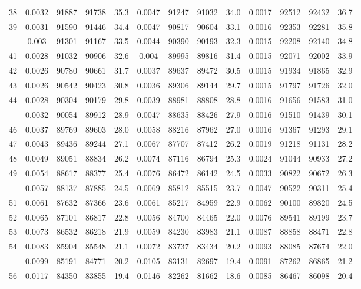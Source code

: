 \documentclass[
  14pt,
]{article}
\begin{document}
\begin{longtable}[t]{lcccccccccccc}
38 & 0.0032 & 91887 & 91738 & 35.3 & 0.0047 & 91247 & 91032 & 34.0 & 0.0017 & 92512 & 92432 & 36.7\\
39 & 0.0031 & 91590 & 91446 & 34.4 & 0.0047 & 90817 & 90604 & 33.1 & 0.0016 & 92353 & 92281 & 35.8\\
\addlinespace
40 & 0.003 & 91301 & 91167 & 33.5 & 0.0044 & 90390 & 90193 & 32.3 & 0.0015 & 92208 & 92140 & 34.8\\
41 & 0.0028 & 91032 & 90906 & 32.6 & 0.004 & 89995 & 89816 & 31.4 & 0.0015 & 92071 & 92002 & 33.9\\
42 & 0.0026 & 90780 & 90661 & 31.7 & 0.0037 & 89637 & 89472 & 30.5 & 0.0015 & 91934 & 91865 & 32.9\\
43 & 0.0026 & 90542 & 90423 & 30.8 & 0.0036 & 89306 & 89144 & 29.7 & 0.0015 & 91797 & 91726 & 32.0\\
44 & 0.0028 & 90304 & 90179 & 29.8 & 0.0039 & 88981 & 88808 & 28.8 & 0.0016 & 91656 & 91583 & 31.0\\
\addlinespace
45 & 0.0032 & 90054 & 89912 & 28.9 & 0.0047 & 88635 & 88426 & 27.9 & 0.0016 & 91510 & 91439 & 30.1\\
46 & 0.0037 & 89769 & 89603 & 28.0 & 0.0058 & 88216 & 87962 & 27.0 & 0.0016 & 91367 & 91293 & 29.1\\
47 & 0.0043 & 89436 & 89244 & 27.1 & 0.0067 & 87707 & 87412 & 26.2 & 0.0019 & 91218 & 91131 & 28.2\\
48 & 0.0049 & 89051 & 88834 & 26.2 & 0.0074 & 87116 & 86794 & 25.3 & 0.0024 & 91044 & 90933 & 27.2\\
49 & 0.0054 & 88617 & 88377 & 25.4 & 0.0076 & 86472 & 86142 & 24.5 & 0.0033 & 90822 & 90672 & 26.3\\
\addlinespace
50 & 0.0057 & 88137 & 87885 & 24.5 & 0.0069 & 85812 & 85515 & 23.7 & 0.0047 & 90522 & 90311 & 25.4\\
51 & 0.0061 & 87632 & 87366 & 23.6 & 0.0061 & 85217 & 84959 & 22.9 & 0.0062 & 90100 & 89820 & 24.5\\
52 & 0.0065 & 87101 & 86817 & 22.8 & 0.0056 & 84700 & 84465 & 22.0 & 0.0076 & 89541 & 89199 & 23.7\\
53 & 0.0073 & 86532 & 86218 & 21.9 & 0.0059 & 84230 & 83983 & 21.1 & 0.0087 & 88858 & 88471 & 22.8\\
54 & 0.0083 & 85904 & 85548 & 21.1 & 0.0072 & 83737 & 83434 & 20.2 & 0.0093 & 88085 & 87674 & 22.0\\
\addlinespace
55 & 0.0099 & 85191 & 84771 & 20.2 & 0.0105 & 83131 & 82697 & 19.4 & 0.0091 & 87262 & 86865 & 21.2\\
56 & 0.0117 & 84350 & 83855 & 19.4 & 0.0146 & 82262 & 81662 & 18.6 & 0.0085 & 86467 & 86098 & 20.4\\

\end{longtable}
\end{document}
